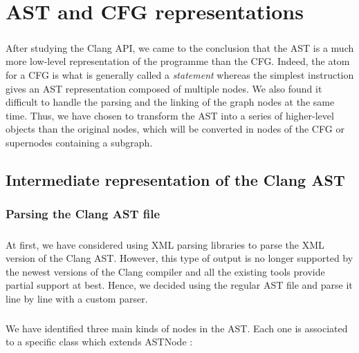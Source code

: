 \documentclass{report}
\begin{document}
\chapter{AST and CFG representations}

\paragraph{}
\hspace{4mm}\textnormal{After studying the Clang API, we came to the conclusion that the AST is a much more low-level representation of the programme than the CFG. 
Indeed, the atom for a CFG is what is generally called a \textit{statement} whereas the simplest instruction
gives an AST representation composed of multiple nodes. We also found it difficult to handle the parsing and the linking of the graph nodes at the same time.
Thus, we have chosen to transform the AST into a series of higher-level objects than the original nodes, which will be converted
in nodes of the CFG or supernodes containing a subgraph.}

\section{Intermediate representation of the Clang AST}

\subsection{Parsing the Clang AST file}

\paragraph{}
\hspace{4mm}\textnormal{At first, we have considered using XML parsing libraries to parse the XML version of the Clang AST. However, 
this type of output is no longer supported by the newest versions of the Clang compiler and all the existing tools
provide partial support at best. Hence, we decided using the regular AST file and parse it line by line 
with a custom parser.}

\paragraph{}
\hspace{4mm}\textnormal{We have identified three main kinds of nodes in the AST. Each one is associated to a specific class which extends ASTNode :}
\end{document}
